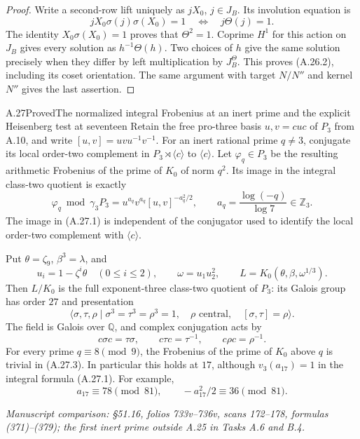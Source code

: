 \begin{proof}
Write a second-row lift uniquely as $jX_0$,
$j\in J_B$. Its involution equation is
\[
 jX_0\sigma(j)\sigma(X_0)=1
       \quad\Longleftrightarrow\quad j\Theta(j)=1.
\]
The identity $X_0\sigma(X_0)=1$ proves that
$\Theta^2=1$. Coprime $H^1$ for this action
on $J_B$ gives every solution as
$h^{-1}\Theta(h)$. Two choices of $h$ give
the same solution precisely when they differ
by left multiplication by $J_B^{\Theta}$.
This proves (A.26.2), including its coset
orientation. The same argument with target
$N/N''$ and kernel $N''$ gives the last
assertion.
\end{proof}

\begin{statement}{A.27}{Proved}{The normalized integral Frobenius at an inert prime and the explicit Heisenberg test at seventeen}
Retain the free pro-three basis $u,v=cuc$ of $P_3$ from
A.10, and write $[u,v]=uvu^{-1}v^{-1}$. For an inert
rational prime $q\ne3$, conjugate its local order-two
complement in $P_3\rtimes\langle c\rangle$ to $\langle c\rangle$.
Let $\varphi_q\in P_3$ be the resulting arithmetic Frobenius
of the prime of $K_0$ of norm $q^2$. Its image in the
integral class-two quotient is exactly
\[
 \varphi_q\bmod\gamma_3P_3
       =u^{a_q}v^{a_q}[u,v]^{-a_q^2/2},
 \qquad a_q=\frac{\log(-q)}{\log7}\in\mathbb Z_3.
 \tag{A.27.1}
\]
The image in (A.27.1) is independent of the conjugator
used to identify the local order-two complement with
$\langle c\rangle$.

Put $\theta=\zeta_9$, $\beta^3=\lambda$, and
\[
 u_i=1-\zeta^i\theta\quad(0\le i\le2),\qquad
 \omega=u_1u_2^2,
 \qquad
 L=K_0(\theta,\beta,\omega^{1/3}).
 \tag{A.27.2}
\]
Then $L/K_0$ is the full exponent-three class-two
quotient of $P_3$: its Galois group has order $27$ and
presentation
\[
 \langle\sigma,\tau,\rho\mid
  \sigma^3=\tau^3=\rho^3=1,\quad
  \rho\text{ central},\quad[\sigma,\tau]=\rho\rangle.
 \tag{A.27.3}
\]
The field is Galois over $\mathbb Q$, and complex
conjugation acts by
\[
 c\sigma c=\tau\sigma,
 \qquad c\tau c=\tau^{-1},
 \qquad c\rho c=\rho^{-1}.
 \tag{A.27.4}
\]
For every prime $q\equiv8\pmod9$, the Frobenius of
the prime of $K_0$ above $q$ is trivial in (A.27.3).
In particular this holds at $17$, although
$v_3(a_{17})=1$ in the integral formula (A.27.1).
For example,
\[
 a_{17}\equiv78\pmod{81},\qquad
 -a_{17}^2/2\equiv36\pmod{81}.
 \tag{A.27.5}
\]
\par\smallskip\noindent\emph{Manuscript comparison: \S51.16,
folios 733v--736v, scans 172--178, formulas (371)--(379);
the first inert prime outside A.25 in Tasks A.6 and B.4.}
\end{statement}
